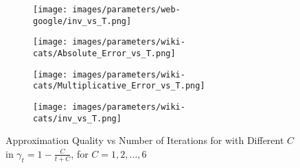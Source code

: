 \begin{figure}[H]
\begin{subfigure}[b]{\textwidth}
\begin{minipage}[b]{0.3\textwidth}
			\texttt{[image: images/parameters/web-google/inv\_vs\_T.png]} %
		\end{minipage}
	\end{subfigure}
	\begin{subfigure}[b]{\textwidth}
		\centering
		\begin{minipage}[b]{0.05\textwidth}
			\centering
		\end{minipage}%
		\begin{minipage}[b]{0.3\textwidth}
			\centering
			\texttt{[image: images/parameters/wiki-cats/Absolute\_Error\_vs\_T.png]} %
			
		\end{minipage}%
		\begin{minipage}[b]{0.3\textwidth}
			\centering
			
			\texttt{[image: images/parameters/wiki-cats/Multiplicative\_Error\_vs\_T.png]} %
			
		\end{minipage}%
		\begin{minipage}[b]{0.3\textwidth}
			\centering
			
			\texttt{[image: images/parameters/wiki-cats/inv\_vs\_T.png]} %
		\end{minipage}
	\end{subfigure}
	\caption{Approximation Quality vs Number of Iterations for \prexp with Different $C$ in 
		$\gamma_t = 1 - \frac{C}{t+C}$, for $C = 1, 2, \ldots, 6$
	}
	\label{fig:parameter_normal_graphs}
\end{figure}



